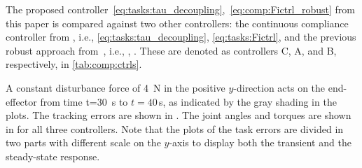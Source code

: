 \documentclass[../main.tex]{subfiles}
\begin{document}

The proposed controller~\eqref{eq:tasks:tau_decoupling},~\eqref{eq:comp:Fictrl_robust} from this paper is compared against two other controllers: the continuous compliance controller from \cite{Saeboe2022}, i.e., \eqref{eq:tasks:tau_decoupling}, \eqref{eq:tasks:Fictrl}, and the previous robust approach from~\cite{DyrhaugTveter2023}, i.e., , . These are denoted as controllers C, A, and B, respectively, in \cref{tab:comp:ctrls}.

A constant disturbance force of \qty{4}{\newton} in the positive $y$-direction acts on the end-effector from time \qty[parse-numbers=false]{t=30}{\second} to $t=40$\,\si{\second}, as indicated by the gray shading in the plots.
The tracking errors are shown in . The joint angles and torques are shown in  for all three controllers. Note that the plots of the task errors are divided in two parts with different scale on the $y$-axis to display both the transient and the steady-state response.
\end{document}

